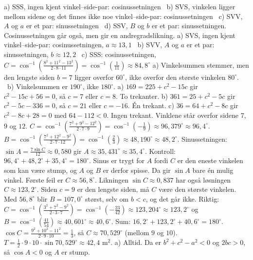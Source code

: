  a) SSS, ingen kjent vinkel–side-par: cosinussetningen \ b) SVS, vinkelen ligger mellom sidene og det finnes ikke noe vinkel–side-par: cosinussetningen \ c) SVV, $A$ og $a$ er et par: sinussetningen \ d) SSV, $B$ og $b$ er et par: sinussetningen. Cosinussetningen går også, men gir en andregradslikning.
 a) SVS, ingen kjent vinkel–side-par: cosinussetningen, $a \approx 13{,}1$ \ b) SVV, $A$ og $a$ er et par: sinussetningen, $b \approx 12{,}2$ \ c) SSS: cosinussetningen, $C = \cos^{-1}\!\left(\frac{8^2 + 11^2 - 13^2}{2\cdot 8\cdot 11}\right) = \cos^{-1}\!\left(\frac{1}{11}\right) \approx 84{,}8^\circ$
 a) Vinkelsummen stemmer, men den lengste siden $b = 7$ ligger overfor $60^\circ$, ikke overfor den største vinkelen $80^\circ$. \ b) Vinkelsummen er $190^\circ$, ikke $180^\circ$.
 a) $169 = 225 + c^2 - 15c$ gir $c^2 - 15c + 56 = 0$, så $c = 7$ eller $c = 8$. To trekanter.
b) $361 = 25 + c^2 - 5c$ gir $c^2 - 5c - 336 = 0$, så $c = 21$ eller $c = -16$. Én trekant.
c) $36 = 64 + c^2 - 8c$ gir $c^2 - 8c + 28 = 0$ med $64 - 112 < 0$. Ingen trekant.
 Vinklene står overfor sidene $7$, $9$ og $12$. $C = \cos^{-1}\!\left(\frac{7^2 + 9^2 - 12^2}{2\cdot 7\cdot 9}\right) = \cos^{-1}(-\frac19) \approx 96{,}379^\circ \approx 96{,}4^\circ$. $B = \cos^{-1}\!\left(\frac{7^2 + 12^2 - 9^2}{2\cdot 7\cdot 12}\right) = \cos^{-1}(\frac23) \approx 48{,}190^\circ \approx 48{,}2^\circ$.
Sinussetningen: $\sin A = \frac{7\sin C}{12} \approx 0{,}580$ gir $A \approx 35{,}431^\circ \approx 35{,}4^\circ$. Kontroll: $96{,}4^\circ + 48{,}2^\circ + 35{,}4^\circ = 180^\circ$.
Sinus er trygt for $A$ fordi $C$ er den eneste vinkelen som kan være stump, og $A$ og $B$ er derfor spisse. Da gir $\sin A$ bare én mulig vinkel.
 Første feil er $C \approx 56{,}8^\circ$. Likningen $\sin C \approx 0{,}837$ har også løsningen $C \approx 123{,}2^\circ$. Siden $c = 9$ er den lengste siden, må $C$ være den største vinkelen. Med $56{,}8^\circ$ blir $B = 107{,}0^\circ$ størst, selv om $b < c$, og det går ikke.
Riktig: $C = \cos^{-1}\!\left(\frac{3^2 + 7^2 - 9^2}{2\cdot 3\cdot 7}\right) = \cos^{-1}(-\frac{23}{42}) \approx 123{,}204^\circ \approx 123{,}2^\circ$ og $B = \cos^{-1}(\frac{41}{54}) \approx 40{,}601^\circ \approx 40{,}6^\circ$. Sum: $16{,}2^\circ + 123{,}2^\circ + 40{,}6^\circ = 180^\circ$.
 $\cos C = \frac{9^2 + 10^2 - 11^2}{2\cdot9\cdot10} = \frac13$, så $C \approx 70{,}529^\circ$ (mellom $9$ og $10$). $T = \frac12\cdot9\cdot10\cdot\sin 70{,}529^\circ \approx 42{,}4$ m$^2$.
 a) Alltid. Da er $b^2 + c^2 - a^2 < 0$ og $2bc > 0$, så $\cos A < 0$ og $A$ er stump.
